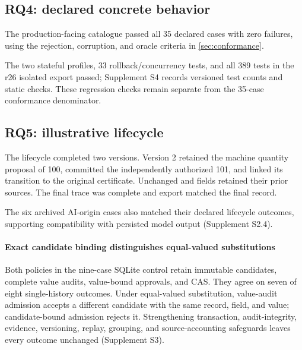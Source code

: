 \subsection{RQ4: declared concrete behavior}

The production-facing catalogue passed all 35 declared cases with zero failures, using the rejection, corruption, and oracle criteria in \cref{sec:conformance}.

The two stateful profiles, 33 rollback/concurrency tests, and all 389 tests in the r26 isolated export passed; Supplement S4 records versioned test counts and static checks. These regression checks remain separate from the 35-case conformance denominator.



\subsection{RQ5: illustrative lifecycle}

The lifecycle completed two versions. Version 2 retained the machine quantity proposal of 100, committed the independently authorized 101, and linked its transition to the original certificate. Unchanged  and  fields retained their prior sources. The final trace was complete and export matched the final record.

The six archived AI-origin cases also matched their declared lifecycle outcomes, supporting compatibility with persisted model output (Supplement S2.4).

\paragraph{Exact candidate binding distinguishes equal-valued substitutions}
\label{sec:executable-relation-result}
Both policies in the nine-case SQLite control retain immutable candidates, complete value audits, value-bound approvals, and CAS. They agree on seven of eight single-history outcomes. Under equal-valued substitution, value-audit admission accepts a different candidate with the same record, field, and value; candidate-bound admission rejects it. Strengthening transaction, audit-integrity, evidence, versioning, replay, grouping, and source-accounting safeguards leaves every outcome unchanged (Supplement S3).

